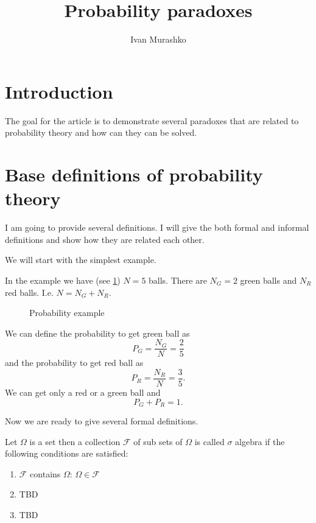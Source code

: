 \documentclass[14pt,a4paper]{article}
\title{Probability paradoxes}
\author{Ivan Murashko}
\date{}
\begin{document}
\maketitle
\tableofcontents

\section*{Introduction}
The goal for the article is to demonstrate several paradoxes that are
related to probability theory and how can they can be solved.

\section{Base definitions of probability theory}
I am going to provide several definitions. I will give the both formal
and informal definitions and show how they are related each other.

We will start with the simplest example. 
\begin{example}
\label{ex:initial}
In the example we have (see \cref{fig:simpleprobability}) $N=5$ balls.
There are $N_G = 2$ green balls and $N_R$ red balls. I.e. $N = N_G +
N_R$.  
\begin{figure}[H]
  \centering
  \caption{Probability example}
  \label{fig:simpleprobability}
\end{figure}

We can define the probability to get green ball as
\[
P_G = \frac{N_G}{N} = \frac{2}{5}
\]
and the probability to get red ball as
\[
P_R = \frac{N_R}{N} = \frac{3}{5}.
\]
We can get only a red or a green ball and 
\[
P_G + P_R = 1.
\]
\end{example}

Now we are ready to give several formal definitions. 
\begin{definition}
Let $\Omega$ is a set then a collection $\mathcal{F}$ of sub sets of
$\Omega$ is called $\sigma$ algebra if the following conditions are
satisfied:
\begin{enumerate}
\item $\mathcal{F}$ contains $\Omega$: $\Omega \in \mathcal{F}$
\item TBD
\item TBD
\end{enumerate} 
\end{definition}
\end{document}
